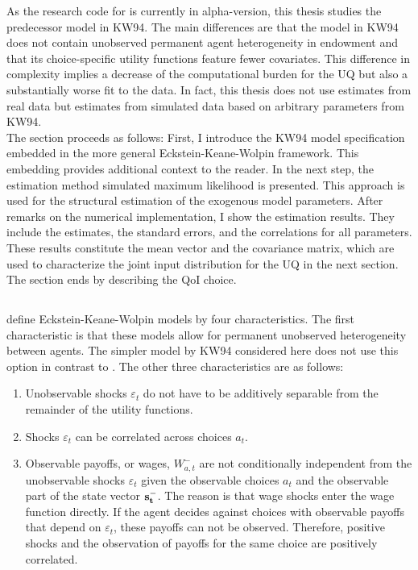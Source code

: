 As the research code for \cite{Keane.1997} is currently in alpha-version, this thesis studies the predecessor model in KW94. The main differences are that the model in KW94 does not contain unobserved permanent agent heterogeneity in endowment and that its choice-specific utility functions feature fewer covariates. This difference in complexity implies a decrease of the computational burden for the UQ but also a substantially worse fit to the data. In fact, this thesis does not use estimates from real data but estimates from simulated data based on arbitrary parameters from KW94.\\
\newline
The section proceeds as follows: First, I introduce the  KW94 model specification embedded in the more general Eckstein-Keane-Wolpin framework. This embedding provides additional context to the reader. In the next step, the estimation method simulated maximum likelihood is presented. This approach is used for the structural estimation of the exogenous model parameters. After remarks on the numerical implementation, I show the estimation results. They include the estimates, the standard errors, and the correlations for all parameters. These results constitute the mean vector and the covariance matrix, which are used to characterize the joint input distribution for the UQ in the next section. The section ends by describing the QoI choice.

\subsection{\cite{Keane.1994}}

\cite{Aguirregabiria.2010} define Eckstein-Keane-Wolpin models by four characteristics. The first characteristic is that these models allow for permanent unobserved heterogeneity between agents. The simpler model by KW94 considered here does not use this option in contrast to \cite{Keane.1997}. The other three characteristics are as follows:
\begin{enumerate}
	\item Unobservable shocks $\varepsilon_t$ do not have to be additively separable from the remainder of the utility functions.
	\item Shocks $\varepsilon_t$ can be correlated across choices $a_t$.
	\item Observable payoffs, or wages, $W_{a,t}^{-}$ are not conditionally independent from the unobservable shocks $\varepsilon_t$ given the observable choices $a_t$ and the observable part of the state vector $\bold{s_t^-}$. The reason is that wage shocks enter the wage function directly. If the agent decides against choices with observable payoffs that depend on $\varepsilon_t$, these payoffs can not be observed. Therefore, positive shocks and the observation of payoffs for the same choice are positively correlated.
\end{enumerate}

